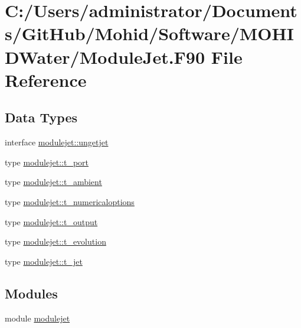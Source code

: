 \hypertarget{_module_jet_8_f90}{}\section{C\+:/\+Users/administrator/\+Documents/\+Git\+Hub/\+Mohid/\+Software/\+M\+O\+H\+I\+D\+Water/\+Module\+Jet.F90 File Reference}
\label{_module_jet_8_f90}
\subsection*{Data Types}
\begin{DoxyCompactItemize}
\item 
interface \mbox{\hyperlink{interfacemodulejet_1_1ungetjet}{modulejet\+::ungetjet}}
\item 
type \mbox{\hyperlink{structmodulejet_1_1t__port}{modulejet\+::t\+\_\+port}}
\item 
type \mbox{\hyperlink{structmodulejet_1_1t__ambient}{modulejet\+::t\+\_\+ambient}}
\item 
type \mbox{\hyperlink{structmodulejet_1_1t__numericaloptions}{modulejet\+::t\+\_\+numericaloptions}}
\item 
type \mbox{\hyperlink{structmodulejet_1_1t__output}{modulejet\+::t\+\_\+output}}
\item 
type \mbox{\hyperlink{structmodulejet_1_1t__evolution}{modulejet\+::t\+\_\+evolution}}
\item 
type \mbox{\hyperlink{structmodulejet_1_1t__jet}{modulejet\+::t\+\_\+jet}}
\end{DoxyCompactItemize}
\subsection*{Modules}
\begin{DoxyCompactItemize}
\item 
module \mbox{\hyperlink{namespacemodulejet}{modulejet}}
\end{DoxyCompactItemize}
